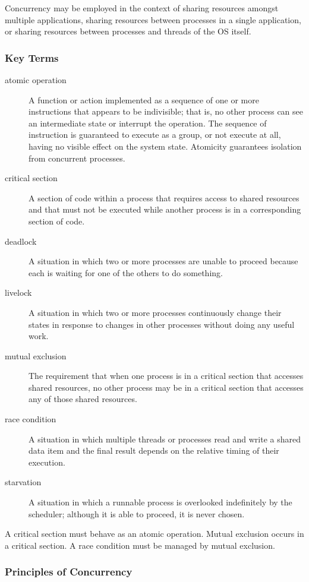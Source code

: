 Concurrency may be employed in the context of sharing resources amongst multiple applications, sharing resources between processes in a single application, or sharing resources between processes and threads of the OS itself.

\subsubsection{Key Terms}

\begin{description}
  \item[atomic operation] A function or action implemented as a sequence of one or more instructions that appears to be indivisible; that is, no other process can see an intermediate state or interrupt the operation.
  The sequence of instruction is guaranteed to execute as a group, or not execute at all, having no visible effect on the system state.
  Atomicity guarantees isolation from concurrent processes.
  \item[critical section] A section of code within a process that requires access to shared resources and that must not be executed while another process is in a corresponding section of code.
  \item[deadlock] A situation in which two or more processes are unable to proceed because each is waiting for one of the others to do something.
  \item[livelock] A situation in which two or more processes continuously change their states in response to changes in other processes without doing any useful work.
  \item[mutual exclusion] The requirement that when one process is in a critical section that accesses shared resources, no other process may be in a critical section that accesses any of those shared resources.
  \item[race condition] A situation in which multiple threads or processes read and write a shared data item and the final result depends on the relative timing of their execution.
  \item[starvation] A situation in which a runnable process is overlooked indefinitely by the scheduler; although it is able to proceed, it is never chosen.
\end{description}

A critical section must behave as an atomic operation.
Mutual exclusion occurs in a critical section.
A race condition must be managed by mutual exclusion.

\subsubsection{Principles of Concurrency}

